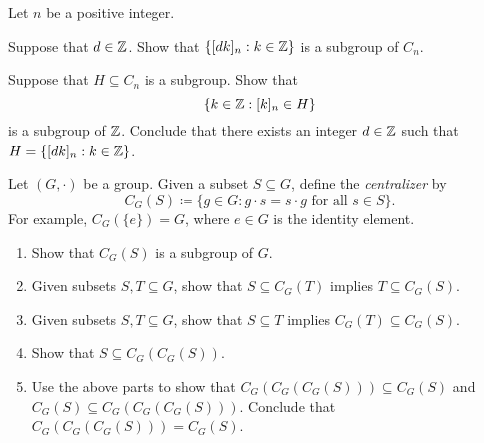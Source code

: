 \documentclass[../main.tex]{subfiles}
\begin{document}
\begin{homework}
    Let $n$ be a positive integer.
    \begin{listalph}
        \item Suppose that $d\in\mathbb Z$. Show that $\{[dk]_n:k\in\mathbb Z\}$ is a subgroup of $C_n$.
        \item Suppose that $H\subseteq C_n$ is a subgroup. Show that
        \[\{k\in\mathbb Z:[k]_n\in H\}\]
        is a subgroup of $\mathbb Z$. Conclude that there exists an integer $d\in\mathbb Z$ such that $H=\{[dk]_n:k\in\mathbb Z\}$.
    \end{listalph}
\end{homework}

\begin{homework}
    Let $(G,\cdot)$ be a group. Given a subset $S\subseteq G$, define the \textit{centralizer} by
    \[C_G(S)\coloneqq\{g\in G:g\cdot s=s\cdot g\text{ for all }s\in S\}.\]
    For example, $C_G(\{e\})=G$, where $e\in G$ is the identity element.
    \begin{enumerate}[label=(\alph*)]
        \item Show that $C_G(S)$ is a subgroup of $G$.
        \item Given subsets $S,T\subseteq G$, show that $S\subseteq C_G(T)$ implies $T\subseteq C_G(S)$.
        \item Given subsets $S,T\subseteq G$, show that $S\subseteq T$ implies $C_G(T)\subseteq C_G(S)$.
        \item Show that $S\subseteq C_G(C_G(S))$.
        \item Use the above parts to show that $C_G(C_G(C_G(S)))\subseteq C_G(S)$ and $C_G(S)\subseteq C_G(C_G(C_G(S)))$. Conclude that $C_G(C_G(C_G(S)))=C_G(S)$.
    \end{enumerate}
\end{homework}
\end{document}
